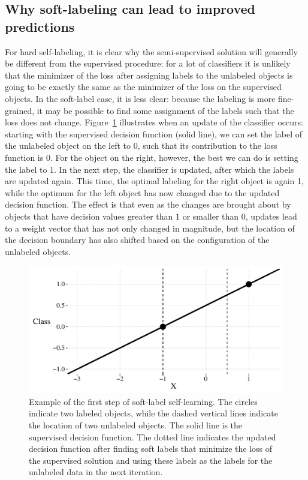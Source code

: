\documentclass[conference,a4paper,10pt]{IEEEtran}\usepackage[]{graphicx}\usepackage[]{color}
\makeatletter
\def\maxwidth{ %
  \ifdim\Gin@nat@width>\linewidth
    \linewidth
  \else
    \Gin@nat@width
  \fi
}
\newenvironment{knitrout}{}{} %
\makeatother
\begin{document}
\subsection{Why soft-labeling can lead to improved predictions}
For hard self-labeling, it is clear why the semi-supervised solution will generally be different from the supervised procedure: for a lot of classifiers it is unlikely that the minimizer of the loss after assigning labels to the unlabeled objects is going to be exactly the same as the minimizer of the loss on the supervised objects. In the soft-label case, it is less clear: because the labeling is more fine-grained, it may be possible to find some assignment of the labels such that the loss does not change. Figure~\ref{fig:simple-example} illustrates when an update of the classifier occurs: starting with the supervised decision function (solid line), we can set the label of the unlabeled object on the left to $0$, such that its contribution to the loss function is $0$. For the object on the right, however, the best we can do is setting the label to $1$. In the next step, the classifier is updated, after which the labels are updated again. This time, the optimal labeling for the right object is again 1, while the optimum for the left object has now changed due to the updated decision function. The effect is that even as the changes are brought about by objects that have decision values greater than $1$ or smaller than $0$, updates lead to a weight vector that has not only changed in magnitude, but the location of the decision boundary has also shifted based on the configuration of the unlabeled objects.

\begin{knitrout}
\color{fgcolor}\begin{figure}
\includegraphics[width=\maxwidth]{figure/simple-example-1} \caption[Example of the first step of soft-label self-learning]{Example of the first step of soft-label self-learning. The circles indicate two labeled objects, while the dashed vertical lines indicate the location of two unlabeled objects. The solid line is the supervised decision function. The dotted line indicates the updated decision function after finding soft labels that minimize the loss of the supervised solution and using these labels as the labels for the unlabeled data in the next iteration.}\label{fig:simple-example}
\end{figure}


\end{knitrout}
 
\end{document}
